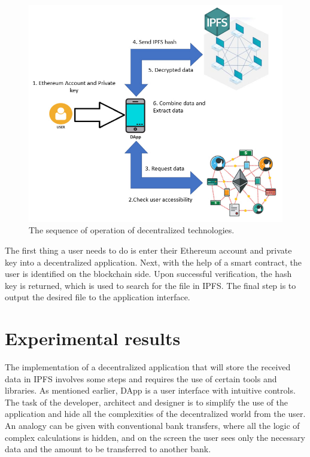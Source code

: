 \documentclass[10pt,conference,a4paper]{IEEEtran_EDM}
\begin{document}
\begin{figure}
\centerline{\includegraphics[scale=0.67]{fig2.png}}
\caption{The sequence of operation of decentralized technologies.}
\label{Sequence}
\end{figure}

The first thing a user needs to do is enter their Ethereum account and private key into a decentralized application. Next, with the help of a smart contract, the user is identified on the blockchain side. Upon successful verification, the hash key is returned, which is used to search for the file in IPFS. The final step is to output the desired file to the application interface. 



\section{Experimental results}
The implementation of a decentralized application that will store the received data in IPFS involves some steps and requires the use of certain tools and libraries. As mentioned earlier, DApp is a user interface with intuitive controls. The task of the developer, architect and designer is to simplify the use of the application and hide all the complexities of the decentralized world from the user. An analogy can be given with conventional bank transfers, where all the logic of complex calculations is hidden, and on the screen the user sees only the necessary data and the amount to be transferred to another bank.
\end{document}
